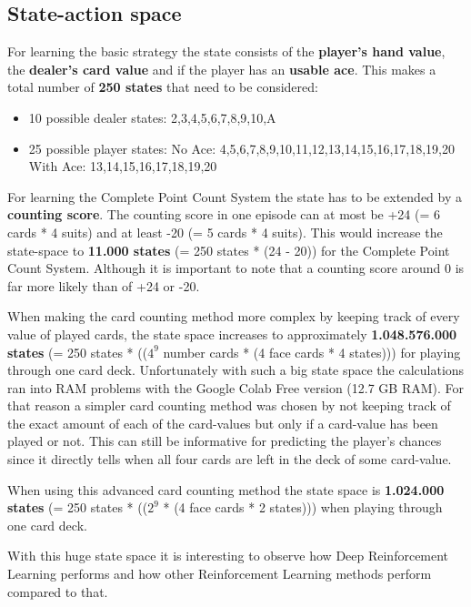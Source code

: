 \documentclass[conference]{IEEEtran}
\begin{document}
\subsection{State-action space}
For learning the basic strategy the state consists of the \textbf{player's hand value}, the \textbf{dealer's card value} and if the player has an \textbf{usable ace}. 
This makes a total number of \textbf{250 states} that need to be considered:
\begin{itemize}
	\item 10 possible dealer states: 2,3,4,5,6,7,8,9,10,A
	\item 25 possible player states:
		\subitem No Ace: 4,5,6,7,8,9,10,11,12,13,14,15,16,17,18,19,20
		\subitem With Ace: 13,14,15,16,17,18,19,20
\end{itemize}

For learning the Complete Point Count System the state has to be extended by a \textbf{counting score}.
The counting score in one episode can at most be +24 (= 6 cards * 4 suits) and at least -20 (= 5 cards * 4 suits).
This would increase the state-space to \textbf{11.000 states} (= 250 states * (24 - 20)) for the Complete Point Count System. 
Although it is important to note that a counting score around 0 is far more likely than of +24 or -20.

When making the card counting method more complex by keeping track of every value of played cards, the state space increases to approximately \textbf{1.048.576.000 states} (= 250 states * (($4^9$ number cards * (4 face cards * 4 states))) for playing through one card deck. 
Unfortunately with such a big state space the calculations ran into RAM problems with the Google Colab Free version (12.7 GB RAM).
For that reason a simpler card counting method was chosen by not keeping track of the exact amount of each of the card-values but only if a card-value has been played or not. 
This can still be informative for predicting the player's chances since it directly tells when all four cards are left in the deck of some card-value.

When using this advanced card counting method the state space is \textbf{1.024.000 states} (= 250 states * (($2^9$ * (4 face cards * 2 states))) when playing through one card deck.

With this huge state space it is interesting to observe how Deep Reinforcement Learning performs and how other Reinforcement Learning methods perform compared to that. 
\end{document}
